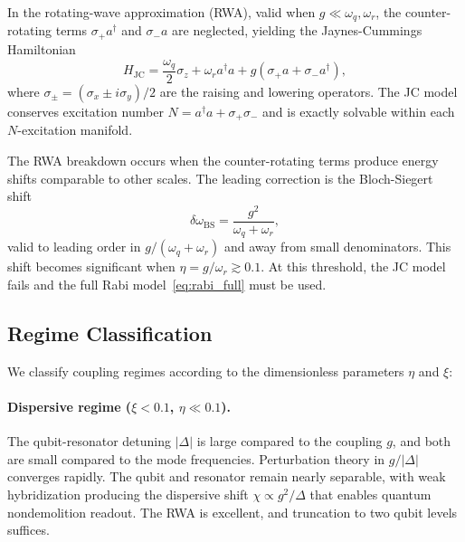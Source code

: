 \documentclass[reprint, floatfix, superscriptaddress, amsmath, amssymb, longbibliography]{revtex4-2}
\begin{document}

In the rotating-wave approximation (RWA), valid when $g \ll \omega_q, \omega_r$, the counter-rotating terms $\sigma_+ a^\dagger$ and $\sigma_- a$ are neglected, yielding the Jaynes-Cummings Hamiltonian~\cite{JaynesCummings1963}
\begin{equation}
H_{\mathrm{JC}} = \frac{\omega_q}{2}\sigma_z + \omega_r a^\dagger a + g(\sigma_+ a + \sigma_- a^\dagger),
\label{eq:jc}
\end{equation}
where $\sigma_\pm = (\sigma_x \pm i\sigma_y)/2$ are the raising and lowering operators. The JC model conserves excitation number $N = a^\dagger a + \sigma_+ \sigma_-$ and is exactly solvable within each $N$-excitation manifold.

The RWA breakdown occurs when the counter-rotating terms produce energy shifts comparable to other scales. The leading correction is the Bloch-Siegert shift~\cite{BlochSiegert1940}
\begin{equation}
\delta\omega_{\mathrm{BS}} = \frac{g^2}{\omega_q + \omega_r},
\label{eq:bloch_siegert}
\end{equation}
valid to leading order in $g/(\omega_q + \omega_r)$ and away from small denominators. This shift becomes significant when $\eta = g/\omega_r \gtrsim 0.1$. At this threshold, the JC model fails and the full Rabi model~\eqref{eq:rabi_full} must be used.

\subsection{Regime Classification}
\label{sec:regime_classification}

We classify coupling regimes according to the dimensionless parameters $\eta$ and $\xi$:

\paragraph{Dispersive regime ($\xi < 0.1$, $\eta \ll 0.1$).} The qubit-resonator detuning $|\Delta|$ is large compared to the coupling $g$, and both are small compared to the mode frequencies. Perturbation theory in $g/|\Delta|$ converges rapidly. The qubit and resonator remain nearly separable, with weak hybridization producing the dispersive shift $\chi \propto g^2/\Delta$ that enables quantum nondemolition readout. The RWA is excellent, and truncation to two qubit levels suffices.
\end{document}
